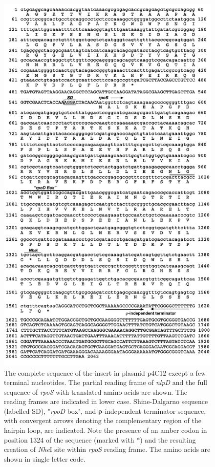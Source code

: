 \begin{figure}[tbp]
\centering
\includegraphics{figures/chap3_4c12}
\caption[\emph{rpoS} homolog of Lz4W]{The complete sequence of the
insert in plasmid p4C12 except a few terminal nucleotides. The
partial reading frame of \emph{nlpD} and the full sequence of
\emph{rpoS} with translated amino acids are shown. The reading
frames are indicated in lower case. Shine-Dalgarno sequence
(labelled SD), "\emph{rpoD} box", and $\rhoup$-independent
terminator sequence, with convergent arrows denoting the
complementary region of the hairpin loop, are indicated. Note the
presence of an amber codon in position 1324 of the sequence
(marked with $\ast$) and the resulting creation of \emph{Nhe}I
site within \emph{rpoS} reading frame. The amino acids are shown
in single letter code.} \label{chap3:4c12}
\end{figure}

